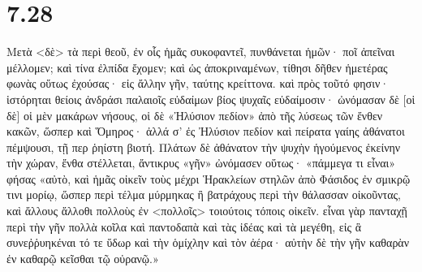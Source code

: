 \section*{7.28}

Μετὰ <δὲ> τὰ περὶ θεοῦ, ἐν οἷς ἡμᾶς συκοφαντεῖ, πυνθάνεται ἡμῶν· ποῖ ἀπεῖναι μέλλομεν; καὶ τίνα ἐλπίδα ἔχομεν; καὶ ὡς ἀποκριναμένων, τίθησι δῆθεν ἡμετέρας φωνὰς οὕτως ἐχούσας· εἰς ἄλλην γῆν, ταύτης κρείττονα. καὶ πρὸς τοῦτό φησιν· ἱστόρηται θείοις ἀνδράσι παλαιοῖς εὐδαίμων βίος ψυχαῖς εὐδαίμοσιν· ὠνόμασαν δὲ [οἱ δὲ] οἱ μὲν μακάρων νήσους, οἱ δὲ «Ἠλύσιον πεδίον» ἀπὸ τῆς λύσεως τῶν ἔνθεν κακῶν, ὥσπερ καὶ Ὅμηρος·
ἀλλά σ' ἐς Ἠλύσιον πεδίον καὶ πείρατα γαίης
ἀθάνατοι πέμψουσι,
τῇ περ ῥηίστη βιοτή.
Πλάτων δὲ ἀθάνατον τὴν ψυχὴν ἡγούμενος ἐκείνην τὴν χώραν, ἔνθα στέλλεται, ἄντικρυς «γῆν» ὠνόμασεν οὕτως· «πάμμεγα τι εἶναι» φήσας «αὐτὸ, καὶ ἡμᾶς οἰκεῖν τοὺς μέχρι Ἡρακλείων στηλῶν ἀπὸ Φάσιδος ἐν σμικρῷ τινι μορίῳ, ὥσπερ περὶ τέλμα μύρμηκας ἢ βατράχους περὶ τὴν θάλασσαν οἰκοῦντας, καὶ ἄλλους ἄλλοθι πολλοὺς ἐν <πολλοῖς> τοιούτοις τόποις οἰκεῖν. εἶναι γὰρ πανταχῇ περὶ τὴν γῆν πολλὰ κοῖλα καὶ παντοδαπὰ καὶ τὰς ἰδέας καὶ τὰ μεγέθη, εἰς ἃ συνεῤῥυηκέναι τό τε ὕδωρ καὶ τὴν ὁμίχλην καὶ τὸν ἀέρα· αὐτὴν δὲ τὴν γῆν καθαρὰν ἐν καθαρῷ κεῖσθαι τῷ οὐρανῷ.»